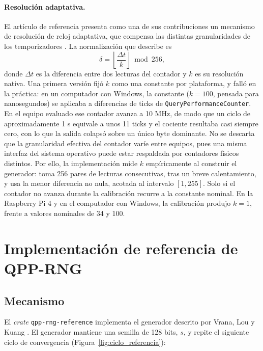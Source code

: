 \paragraph{Resolución adaptativa.} El artículo de referencia presenta como una de sus contribuciones un mecanismo de resolución de reloj adaptativa, que compensa las distintas granularidades de los temporizadores \cite{Vrana2025RawEvaluation}. La normalización que describe es
\begin{equation}
    \delta = \left\lfloor \frac{\Delta t}{k} \right\rfloor \bmod 256,
    \label{eq:normalizacion}
\end{equation}
donde $\Delta t$ es la diferencia entre dos lecturas del contador y $k$ es su resolución nativa. Una primera versión fijó $k$ como una constante por plataforma, y falló en la práctica: en un computador con Windows, la constante ($k = 100$, pensada para nanosegundos) se aplicaba a diferencias de ticks de \texttt{QueryPerformanceCounter}. En el equipo evaluado ese contador avanza a 10 MHz, de modo que un ciclo de aproximadamente 1 \textmu s equivale a unos 11 ticks y el cociente resultaba casi siempre cero, con lo que la salida colapsó sobre un único byte dominante. No se descarta que la granularidad efectiva del contador varíe entre equipos, pues una misma interfaz del sistema operativo puede estar respaldada por contadores físicos distintos. Por ello, la implementación mide $k$ empíricamente al construir el generador: toma 256 pares de lecturas consecutivas, tras un breve calentamiento, y usa la menor diferencia no nula, acotada al intervalo $[1, 255]$. Solo si el contador no avanza durante la calibración recurre a la constante nominal. En la Raspberry Pi 4 y en el computador con Windows, la calibración produjo $k = 1$, frente a valores nominales de 34 y 100.

\section{Implementación de referencia de QPP-RNG}
\label{sec:referencia}

\subsection{Mecanismo}

El \textit{crate} \texttt{qpp-rng-reference} implementa el generador descrito por Vrana, Lou y Kuang \cite{Vrana2025RawEvaluation}. El generador mantiene una semilla de 128 bits, $s$, y repite el siguiente ciclo de convergencia (Figura~\ref{fig:ciclo_referencia}):

